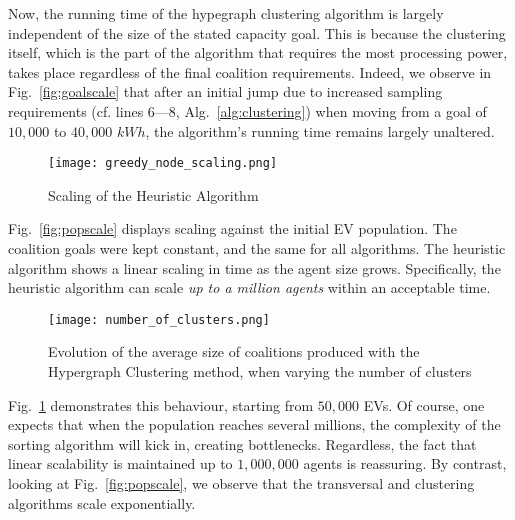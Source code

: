Now, the running time of the hypegraph clustering algorithm is largely independent of the size of the stated capacity goal. 
This is because the clustering itself, which is the part of the algorithm that requires the most processing power, takes place regardless of the final coalition requirements.
Indeed, we observe in Fig.~\ref{fig:goalscale} that after an initial jump due to increased sampling requirements (cf. lines 6---8, Alg.~\ref{alg:clustering}) when moving from a goal of $10,000$ to $40,000$ $kWh$,
the algorithm's running time remains largely unaltered.
\begin{figure}
	\centering
	\texttt{[image: greedy\_node\_scaling.png]}
	
	\caption{Scaling of the Heuristic Algorithm\label{fig:heuristicscaling}}
\end{figure}
Fig.~\ref{fig:popscale} %
displays scaling against the initial EV population. The coalition goals were kept constant, and the same for all algorithms.
The heuristic algorithm shows a linear scaling in time as the agent size grows. Specifically, the heuristic algorithm can scale {\em up to a million agents} within an acceptable time. 
\begin{figure}
	\centering
	\texttt{[image: number\_of\_clusters.png]}
	\caption{Evolution of the average size of coalitions produced with the Hypergraph Clustering method, when varying the number of clusters\label{fig:clusterkscale}}
\end{figure}

Fig.~\ref{fig:heuristicscaling} demonstrates this behaviour, starting from $50,000$ EVs. Of course, one expects that when the population reaches several millions, the complexity of the sorting algorithm will kick in, creating bottlenecks. Regardless, the fact that linear scalability is maintained up to $1,000,000$ agents is reassuring. By contrast, looking at Fig.~\ref{fig:popscale}, we observe that the transversal and clustering algorithms scale exponentially.





